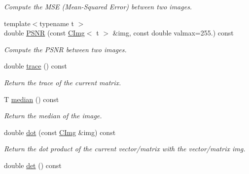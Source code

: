 \begin{DoxyCompactItemize}
\begin{DoxyCompactList}\small\item\em Compute the M\-S\-E (Mean-\/\-Squared Error) between two images. \end{DoxyCompactList}\item 
\hypertarget{structcimg__library_1_1_c_img_a34786cbe18e86f650fab7fd323382e98}{{\footnotesize template$<$typename t $>$ }\\double \hyperlink{structcimg__library_1_1_c_img_a34786cbe18e86f650fab7fd323382e98}{P\-S\-N\-R} (const \hyperlink{structcimg__library_1_1_c_img}{C\-Img}$<$ t $>$ \&img, const double valmax=255.) const }\label{structcimg__library_1_1_c_img_a34786cbe18e86f650fab7fd323382e98}

\begin{DoxyCompactList}\small\item\em Compute the P\-S\-N\-R between two images. \end{DoxyCompactList}\item 
\hypertarget{structcimg__library_1_1_c_img_acbf8651f447f39520618ff22f0649d58}{double \hyperlink{structcimg__library_1_1_c_img_acbf8651f447f39520618ff22f0649d58}{trace} () const }\label{structcimg__library_1_1_c_img_acbf8651f447f39520618ff22f0649d58}

\begin{DoxyCompactList}\small\item\em Return the trace of the current matrix. \end{DoxyCompactList}\item 
\hypertarget{structcimg__library_1_1_c_img_a44734c87ac1724b2675a19ce7f76750e}{T \hyperlink{structcimg__library_1_1_c_img_a44734c87ac1724b2675a19ce7f76750e}{median} () const }\label{structcimg__library_1_1_c_img_a44734c87ac1724b2675a19ce7f76750e}

\begin{DoxyCompactList}\small\item\em Return the median of the image. \end{DoxyCompactList}\item 
\hypertarget{structcimg__library_1_1_c_img_a5715551ea29f928aa02909654415a75f}{double \hyperlink{structcimg__library_1_1_c_img_a5715551ea29f928aa02909654415a75f}{dot} (const \hyperlink{structcimg__library_1_1_c_img}{C\-Img} \&img) const }\label{structcimg__library_1_1_c_img_a5715551ea29f928aa02909654415a75f}

\begin{DoxyCompactList}\small\item\em Return the dot product of the current vector/matrix with the vector/matrix {\ttfamily img}. \end{DoxyCompactList}\item 
\hypertarget{structcimg__library_1_1_c_img_a4909523f4b0c661e3e23b8805c9ac5c2}{double \hyperlink{structcimg__library_1_1_c_img_a4909523f4b0c661e3e23b8805c9ac5c2}{det} () const }\label{structcimg__library_1_1_c_img_a4909523f4b0c661e3e23b8805c9ac5c2}


\end{DoxyCompactItemize}
